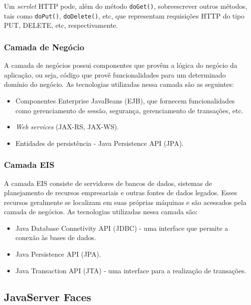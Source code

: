 \documentclass[
  10.5pt,				  %
	openright,			%
	twoside,			  %
  a5paper,
  chapter=TITLE,	%
	section=TITLE,	%
  hyphens,        %
	english,        %
	brazil          %
]{abntex2}
\begin{document}
Um \emph{servlet} HTTP pode, além do método \texttt{doGet()}, sobreescrever outros métodos, tais como \texttt{doPut()}, \texttt{doDelete()}, etc, que representam requisições HTTP do tipo PUT, DELETE, etc, respectivamente.


\subsubsection{Camada de Negócio}\label{sec:camada-negocio}
A camada de negócios possui componentes que provêm a lógica do negócio da aplicação, ou seja, código que provê funcionalidades para um determinado domínio do negócio. As tecnologias utilizadas nessa camada são as seguintes:
\begin{itemize}
  \item Componentes Enterprise JavaBeans (EJB), que fornecem funcionalidades como gerenciamento de sessão, segurança, gerenciamento de transações, etc.
  \item \emph{Web services} (JAX-RS, JAX-WS).
  \item Entidades de persistência - Java Persistence API (JPA).
\end{itemize}


\subsubsection{Camada EIS}

A camada EIS consiste de servidores de bancos de dados, sistemas de planejamento de recursos empresariais e outras fontes de dados legados. Esses recursos geralmente se localizam em suas próprias máquinas e são acessados pela camada de negócios. As tecnologias utilizadas nessa camada são:
\begin{itemize}
  \item Java Database Connetivity API (JDBC) - uma interface que permite a conexão às bases de dados.
  \item Java Persistence API (JPA).
  \item Java Transaction API (JTA) - uma interface para a realização de transações.
\end{itemize}

\subsection{JavaServer Faces}\label{sec:jsf}
\end{document}
